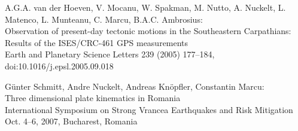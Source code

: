 \documentclass[18pt, a0paper, portrait]{tikzposter}
\begin{document}
\begin{columns}
{        \vspace{-0.75cm}

        \begin{thebibliography}{2}
            A.G.A. van der Hoeven, V. Mocanu, W. Spakman, M. Nutto, A.
            Nuckelt, L. Matenco, L. Munteanu, C. Marcu, B.A.C. Ambrosius:\\
            Observation of present-day tectonic motions in the Southeastern
            Carpathians: Results of the ISES/CRC-461 GPS measurements\\
            Earth and Planetary Science Letters 239 (2005) 177--184,
            doi:10.1016/j.epsl.2005.09.018

            Günter Schmitt, Andre Nuckelt, Andreas Knöpfler, Constantin
            Marcu:\\
            Three dimensional plate kinematics in Romania\\
            International Symposium on Strong Vrancea Earthquakes and Risk
            Mitigation Oct. 4--6, 2007, Bucharest, Romania

        \end{thebibliography}
    }

\end{columns}
\end{document}
